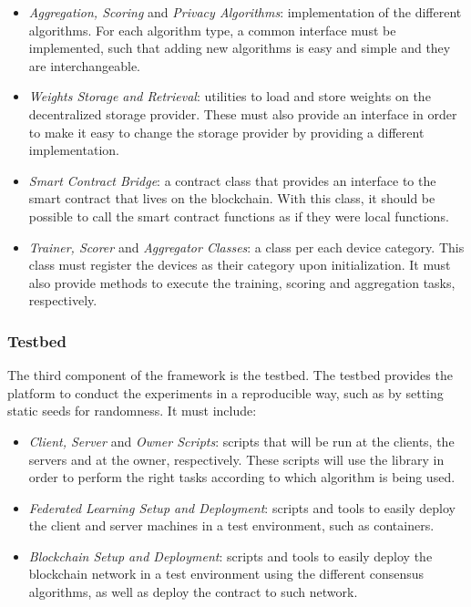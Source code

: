 \begin{itemize}
    \item \textit{Aggregation, Scoring} and \textit{Privacy Algorithms}: implementation of the different algorithms. For each algorithm type, a common interface must be implemented, such that adding new algorithms is easy and simple and they are interchangeable.
    
    \item \textit{Weights Storage and Retrieval}: utilities to load and store weights on the decentralized storage provider. These must also provide an interface in order to make it easy to change the storage provider by providing a different implementation.
    
    \item \textit{Smart Contract Bridge}: a contract class that provides an interface to the smart contract that lives on the blockchain. With this class, it should be possible to call the smart contract functions as if they were local functions.
    
    \item \textit{Trainer, Scorer} and \textit{Aggregator Classes}: a class per each device category. This class must register the devices as their category upon initialization. It must also provide methods to execute the training, scoring and aggregation tasks, respectively.
\end{itemize}

\subsubsection{Testbed}\label{meth:testbed}

The third component of the framework is the testbed. The testbed provides the platform to conduct the experiments in a reproducible way, such as by setting static seeds for randomness. It must include:

\begin{itemize}
    \item \textit{Client, Server} and \textit{Owner Scripts}: scripts that will be run at the clients, the servers and at the owner, respectively. These scripts will use the library in order to perform the right tasks according to which algorithm is being used.
    
    \item \textit{Federated Learning Setup and Deployment}: scripts and tools to easily deploy the client and server machines in a test environment, such as containers.
    
    \item \textit{Blockchain Setup and Deployment}: scripts and tools to easily deploy the blockchain network in a test environment using the different consensus algorithms, as well as deploy the contract to such network.
\end{itemize}

